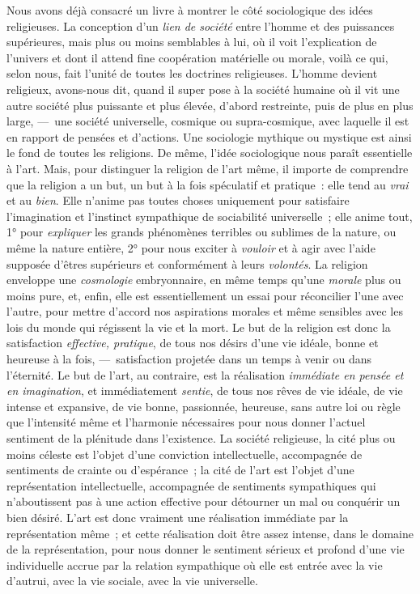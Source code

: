 \documentclass[french,twoside]{book} %
\begin{document}
Nous avons déjà consacré un livre à montrer le côté sociologique des idées religieuses. La conception d’un \emph{lien de société} entre l’homme et des puissances supérieures, mais plus ou moins semblables à lui, où il voit l’explication de l’univers et dont il attend fine coopération matérielle ou morale, voilà ce qui, selon nous, fait l’unité de toutes les doctrines religieuses. L’homme devient religieux, avons-nous dit, quand il super pose à la société humaine où il vit une autre société plus puissante et plus élevée, d’abord restreinte, puis de plus en plus large, — une société universelle, cosmique ou supra-cosmique, avec laquelle il est en rapport de pensées et d’actions. Une sociologie mythique ou mystique est ainsi le fond de toutes les religions. De même, l’idée sociologique nous paraît essentielle à l’art. Mais, pour distinguer la religion de l’art même, il importe de comprendre que la religion a un but, un but à la fois spéculatif et pratique : elle tend au \emph{vrai} et au \emph{bien}. Elle n’anime pas toutes choses uniquement pour satisfaire l’imagination et l’instinct sympathique de sociabilité universelle ; elle anime tout, 1° pour \emph{expliquer} les grands phénomènes terribles ou sublimes de la nature, ou même la nature entière, 2° pour nous exciter à \emph{vouloir} et à agir avec l’aide supposée d’êtres supérieurs et conformément à leurs \emph{volontés}. La religion enveloppe une \emph{cosmologie} embryonnaire, en même temps qu’une \emph{morale} plus ou moins pure, et, enfin, elle est essentiellement un essai pour réconcilier l’une avec l’autre, pour mettre d’accord nos aspirations morales et même sensibles avec les lois du monde qui régissent la vie et la mort. Le but de la religion est donc la satisfaction \emph{effective, pratique}, de tous nos désirs d’une vie idéale, bonne et heureuse à la fois, — satisfaction projetée dans un temps à venir ou dans l’éternité. Le but de l’art, au contraire, est la réalisation \emph{immédiate en pensée et en imagination}, et immédiatement \emph{sentie}, de tous nos rêves de vie idéale, de vie intense et expansive, de vie bonne, passionnée, heureuse, sans autre loi ou règle que l’intensité même et l’harmonie nécessaires pour nous donner l’actuel sentiment de la plénitude dans l’existence. La société religieuse, la cité plus ou moins céleste est l’objet d’une conviction intellectuelle, accompagnée de sentiments de crainte ou d’espérance ; la cité de l’art est l’objet d’une représentation intellectuelle, accompagnée de sentiments sympathiques qui n’aboutissent pas à une action effective pour détourner un mal ou conquérir un bien désiré. L’art est donc vraiment une réalisation immédiate par la représentation même ; et cette réalisation doit être assez intense, dans le domaine de la représentation, pour nous donner le sentiment sérieux et profond d’une vie individuelle accrue par la relation sympathique où elle est entrée avec la vie d’autrui, avec la vie sociale, avec la vie universelle.\par
\end{document}
